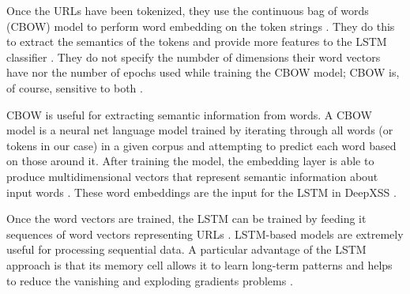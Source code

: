 Once the URLs have been tokenized, they use the continuous bag of words (CBOW) model to perform word embedding on the token strings \cite{fang2018deepxss}. They do this to extract the semantics of the tokens and provide more features to the LSTM classifier \cite{fang2018deepxss}. They do not specify the numbder of dimensions their word vectors have nor the number of epochs used while training the CBOW model; CBOW is, of course, sensitive to both \cite{mikolov2013efficient}.

CBOW is useful for extracting semantic information from words. A CBOW model is a neural net language model trained by iterating through all words (or tokens in our case) in a given corpus and attempting to predict each word based on those around it. After training the model, the embedding layer is able to produce multidimensional vectors that represent semantic information about input words \cite{mikolov2013efficient}. These word embeddings are the input for the LSTM in DeepXSS \cite{fang2018deepxss}.

Once the word vectors are trained, the LSTM can be trained by feeding it sequences of word vectors representing URLs \cite{fang2018deepxss}. LSTM-based models are extremely useful for processing sequential data. A particular advantage of the LSTM approach is that its memory cell allows it to learn long-term patterns and helps to reduce the vanishing and exploding gradients problems \cite{LSTM}.